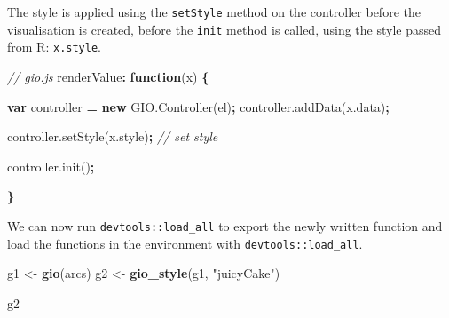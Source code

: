 \documentclass[
]{krantz}
\makeatletter
\newenvironment{Shaded}{\begin{snugshade}}{\end{snugshade}}
\newcommand{\AttributeTok}[1]{\textcolor[rgb]{0.61,0.61,0.61}{#1}}
\newcommand{\CommentTok}[1]{\textcolor[rgb]{0.37,0.37,0.37}{\textit{#1}}}
\newcommand{\ControlFlowTok}[1]{\textcolor[rgb]{0.27,0.27,0.27}{\textbf{#1}}}
\newcommand{\DataTypeTok}[1]{\textcolor[rgb]{0.27,0.27,0.27}{#1}}
\newcommand{\KeywordTok}[1]{\textcolor[rgb]{0.27,0.27,0.27}{\textbf{#1}}}
\newcommand{\NormalTok}[1]{#1}
\newcommand{\OperatorTok}[1]{\textcolor[rgb]{0.43,0.43,0.43}{\textbf{#1}}}
\newcommand{\StringTok}[1]{\textcolor[rgb]{0.5,0.5,0.5}{#1}}
\newcommand{\VariableTok}[1]{\textcolor[rgb]{0,0,0}{#1}}
\newenvironment{kframe}{%
\medskip{}
\setlength{\fboxsep}{.8em}
 \def\at@end@of@kframe{}%
 \ifinner\ifhmode%
  \def\at@end@of@kframe{\end{minipage}}%
  \begin{minipage}{\columnwidth}%
 \fi\fi%
 \def\FrameCommand##1{\hskip\@totalleftmargin \hskip-\fboxsep
 \colorbox{shadecolor}{##1}\hskip-\fboxsep
     \hskip-\linewidth \hskip-\@totalleftmargin \hskip\columnwidth}%
 \MakeFramed {\advance\hsize-\width
   \@totalleftmargin\z@ \linewidth\hsize
   \@setminipage}}%
 {\par\unskip\endMakeFramed%
 \at@end@of@kframe}
\renewenvironment{Shaded}{\begin{kframe}}{\end{kframe}}
\makeatother
\begin{document}
\begin{Shaded}
\end{Shaded}

The style is applied using the \texttt{setStyle} method on the controller before the visualisation is created, before the \texttt{init} method is called, using the style passed from R: \texttt{x.style}.

\begin{Shaded}
\begin{Highlighting}[]
\CommentTok{// gio.js}
\NormalTok{renderValue}\OperatorTok{:} \KeywordTok{function}\NormalTok{(x) }\OperatorTok{\{}

  \KeywordTok{var}\NormalTok{ controller }\OperatorTok{=} \KeywordTok{new} \VariableTok{GIO}\NormalTok{.}\AttributeTok{Controller}\NormalTok{(el)}\OperatorTok{;}
  \VariableTok{controller}\NormalTok{.}\AttributeTok{addData}\NormalTok{(}\VariableTok{x}\NormalTok{.}\AttributeTok{data}\NormalTok{)}\OperatorTok{;} 

  \VariableTok{controller}\NormalTok{.}\AttributeTok{setStyle}\NormalTok{(}\VariableTok{x}\NormalTok{.}\AttributeTok{style}\NormalTok{)}\OperatorTok{;} \CommentTok{// set style}

  \VariableTok{controller}\NormalTok{.}\AttributeTok{init}\NormalTok{()}\OperatorTok{;}

\OperatorTok{\}}
\end{Highlighting}
\end{Shaded}

We can now run \texttt{devtools::load\_all} to export the newly written function and load the functions in the environment with \texttt{devtools::load\_all}.

\begin{Shaded}
\begin{Highlighting}[]
\NormalTok{g1 <{-}}\StringTok{ }\KeywordTok{gio}\NormalTok{(arcs)}
\NormalTok{g2 <{-}}\StringTok{ }\KeywordTok{gio\_style}\NormalTok{(g1, }\StringTok{"juicyCake"}\NormalTok{)}

\NormalTok{g2}
\end{Highlighting}
\end{Shaded}
\end{document}
